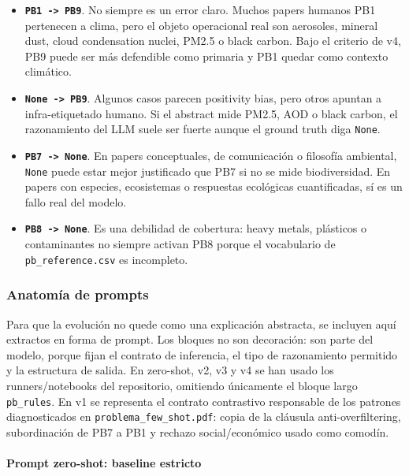 \begin{itemize}
\item \textbf{\texttt{PB1 -> PB9}}. No siempre es un error claro. Muchos papers humanos PB1 pertenecen a clima, pero el objeto operacional real son aerosoles, mineral dust, cloud condensation nuclei, PM2.5 o black carbon. Bajo el criterio de v4, PB9 puede ser más defendible como primaria y PB1 quedar como contexto climático.
\item \textbf{\texttt{None -> PB9}}. Algunos casos parecen positivity bias, pero otros apuntan a infra-etiquetado humano. Si el abstract mide PM2.5, AOD o black carbon, el razonamiento del LLM suele ser fuerte aunque el ground truth diga \texttt{None}.
\item \textbf{\texttt{PB7 -> None}}. En papers conceptuales, de comunicación o filosofía ambiental, \texttt{None} puede estar mejor justificado que PB7 si no se mide biodiversidad. En papers con especies, ecosistemas o respuestas ecológicas cuantificadas, sí es un fallo real del modelo.
\item \textbf{\texttt{PB8 -> None}}. Es una debilidad de cobertura: heavy metals, plásticos o contaminantes no siempre activan PB8 porque el vocabulario de \texttt{pb\_reference.csv} es incompleto.
\end{itemize}

\subsubsection{Anatomía de prompts}

Para que la evolución no quede como una explicación abstracta, se incluyen aquí extractos en forma de prompt. Los bloques no son decoración: son parte del modelo, porque fijan el contrato de inferencia, el tipo de razonamiento permitido y la estructura de salida. En zero-shot, v2, v3 y v4 se han usado los runners/notebooks del repositorio, omitiendo únicamente el bloque largo \texttt{pb\_rules}. En v1 se representa el contrato contrastivo responsable de los patrones diagnosticados en \texttt{problema\_few\_shot.pdf}: copia de la cláusula anti-overfiltering, subordinación de PB7 a PB1 y rechazo social/económico usado como comodín.

\paragraph{Prompt zero-shot: baseline estricto}

